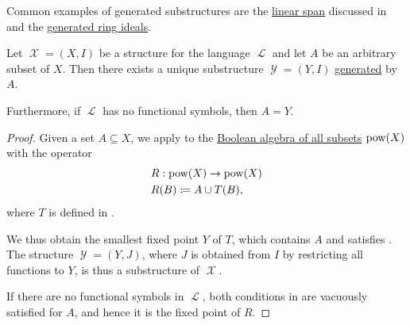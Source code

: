 \begin{example}\label{ex:def:first_order_generated_substructure}
  Common examples of generated substructures are the \hyperref[def:semimodule/submodel]{linear span} discussed in  and the \hyperref[def:semiring_ideal/generated]{generated ring ideals}.
\end{example}

\begin{proposition}\label{thm:first_order_generated_substructures_exist}
  Let \( \mscrX = (X, I) \) be a structure for the language \( \mscrL \) and let \( A \) be an arbitrary subset of \( X \). Then there exists a unique substructure \( \mscrY = (Y, I) \) \hyperref[def:first_order_generated_substructure]{generated} by \( A \).

  Furthermore, if \( \mscrL \) has no functional symbols, then \( A = Y \).
\end{proposition}
\begin{proof}
  Given a set \( A \subseteq X \), we apply  to the \hyperref[thm:boolean_algebra_of_subsets]{Boolean algebra of all subsets} \( \operatorname{pow}(X) \) with the operator
  \begin{equation*}
    \begin{aligned}
      &R: \operatorname{pow}(X) \to \operatorname{pow}(X) \\
      &R(B) \coloneqq A \cup T(B),
    \end{aligned}
  \end{equation*}
  where \( T \) is defined in .

  We thus obtain the smallest fixed point \( Y \) of \( T \), which contains \( A \) and satisfies . The structure \( \mscrY = (Y, J) \), where \( J \) is obtained from \( I \) by restricting all functions to \( Y \), is thus a substructure of \( \mscrX \).

  If there are no functional symbols in \( \mscrL \), both conditions in  are vacuously satisfied for \( A \), and hence it is the fixed point of \( R \).
\end{proof}

